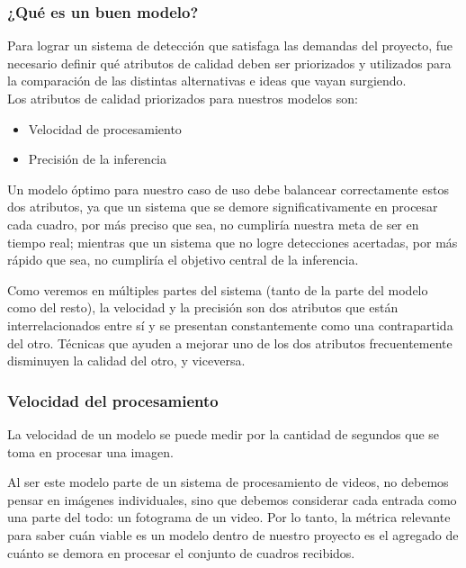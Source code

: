 \documentclass[a4paper]{article}
\begin{document}
\subsubsection{¿Qué es un buen modelo?}

Para lograr un sistema de detección que satisfaga las demandas del proyecto, fue necesario definir qué atributos de calidad deben ser priorizados y utilizados para la comparación de las distintas alternativas e ideas que vayan surgiendo.\\

Los atributos de calidad priorizados para nuestros modelos son:

\begin{itemize}
\itemsep0em
    \item Velocidad de procesamiento
    \item Precisión de la inferencia
\end{itemize}

Un modelo óptimo para nuestro caso de uso debe balancear correctamente estos dos atributos, ya que un sistema que se demore significativamente en procesar cada cuadro, por más preciso que sea, no cumpliría nuestra meta de ser en tiempo real; mientras que un sistema que no logre detecciones acertadas, por más rápido que sea, no cumpliría el objetivo central de la inferencia.

Como veremos en múltiples partes del sistema (tanto de la parte del modelo como del resto), la velocidad y la precisión son dos atributos que están interrelacionados entre sí y se presentan constantemente como una contrapartida del otro. Técnicas que ayuden a mejorar uno de los dos atributos frecuentemente disminuyen la calidad del otro, y viceversa.

\subsubsection{Velocidad del procesamiento}

La velocidad de un modelo se puede medir por la cantidad de segundos que se toma en procesar una imagen.

Al ser este modelo parte de un sistema de procesamiento de videos, no debemos pensar en imágenes individuales, sino que debemos considerar cada entrada como una parte del todo: un fotograma de un video. Por lo tanto, la métrica relevante para saber cuán viable es un modelo dentro de nuestro proyecto es el agregado de cuánto se demora en procesar el conjunto de cuadros recibidos.
\end{document}
